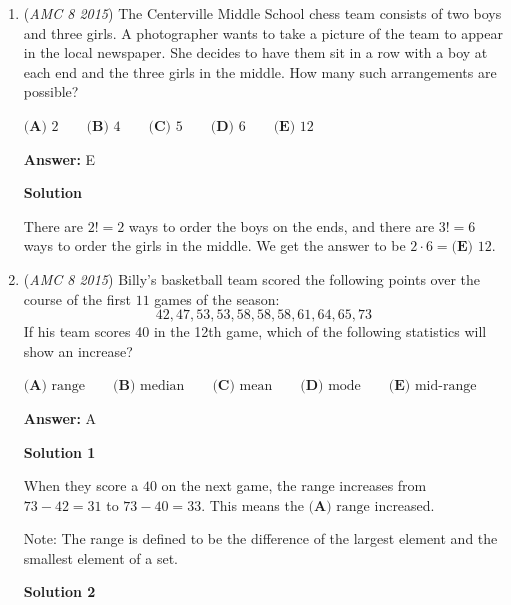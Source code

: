 \begin{enumerate}
\textbf{Solution 2}

T=D/sJill: (1/10)x60 because in minutes, is equal to 6 minJack:(1/4)x60 is 15 minutes.15-6 is 9, so our answer is $15-6=\boxed{\textbf{(D)}~9}$  - TheNerdWhoIsNerdy.

 


 


	\item (\textit{AMC 8 2015}) The Centerville Middle School chess team consists of two boys and three girls. A photographer wants to take a picture of the team to appear in the local newspaper. She decides to have them sit in a row with a boy at each end and the three girls in the middle. How many such arrangements are possible? 


 $\textbf{(A) }2\qquad\textbf{(B) }4\qquad\textbf{(C) }5\qquad\textbf{(D) }6\qquad \textbf{(E) }12$

 \textbf{Answer: }E



\textbf{Solution}

There are $2! = 2$ ways to order the boys on the ends, and there are $3!=6$ ways to order the girls in the middle. We get the answer to be $2 \cdot 6 = \boxed{\textbf{(E) }12}$.

 


	\item (\textit{AMC 8 2015}) Billy's basketball team scored the following points over the course of the first $11$ games of the season: 
 \[42, 47, 53, 53, 58, 58, 58, 61, 64, 65, 73\] If his team scores 40 in the 12th game, which of the following statistics will show an increase?


 $\textbf{(A) } \text{range} \qquad \textbf{(B) } \text{median} \qquad \textbf{(C) } \text{mean} \qquad \textbf{(D) } \text{mode} \qquad \textbf{(E) } \text{mid-range}$

 \textbf{Answer: }A



\textbf{Solution 1}

When they score a $40$ on the next game, the range increases from $73-42=31$ to $73-40=33$.  This means the $\boxed{\textbf{(A) } \text{range}}$ increased.

 Note: The range is defined to be the difference of the largest element and the smallest element of a set.

 



\textbf{Solution 2}


\end{enumerate}
